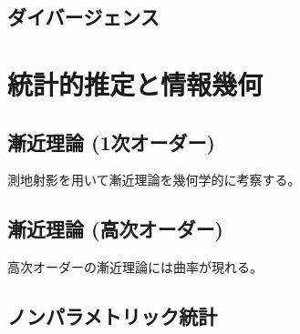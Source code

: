 \documentclass[report]{jlreq}
\begin{document}
%
\section{ダイバージェンス}



%
\chapter{統計的推定と情報幾何}

%
\section{漸近理論 (1次オーダー)}

測地射影を用いて漸近理論を幾何学的に考察する。

\TODO{}

%
\section{漸近理論 (高次オーダー)}

高次オーダーの漸近理論には曲率が現れる。

\TODO{}

%
\section{ノンパラメトリック統計}

\begin{definition}
    \TODO{}
\end{definition}
\end{document}
